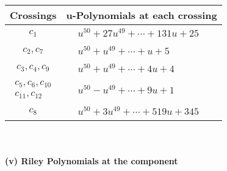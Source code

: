 \documentclass[1p]{elsarticle_modified}
\theoremstyle{definition}
\begin{document}
\begin{tabular}{m{50pt}|m{274pt}}
Crossings & \hspace{64pt}u-Polynomials at each crossing \\
\hline $$\begin{aligned}c_{1}\end{aligned}$$&$\begin{aligned}
&u^{50}+27 u^{49}+\cdots+131 u+25
\end{aligned}$\\
\hline $$\begin{aligned}c_{2},c_{7}\end{aligned}$$&$\begin{aligned}
&u^{50}+u^{49}+\cdots+u+5
\end{aligned}$\\
\hline $$\begin{aligned}c_{3},c_{4},c_{9}\end{aligned}$$&$\begin{aligned}
&u^{50}+u^{49}+\cdots+4 u+4
\end{aligned}$\\
\hline $$\begin{aligned}c_{5},c_{6},c_{10}\\c_{11},c_{12}\end{aligned}$$&$\begin{aligned}
&u^{50}- u^{49}+\cdots+9 u+1
\end{aligned}$\\
\hline $$\begin{aligned}c_{8}\end{aligned}$$&$\begin{aligned}
&u^{50}+3 u^{49}+\cdots+519 u+345
\end{aligned}$\\
\hline
\end{tabular}\\~\\
\newpage\renewcommand{\arraystretch}{1}
\flushleft \textbf{(v) Riley Polynomials at the component}\newline \\
\end{document}
